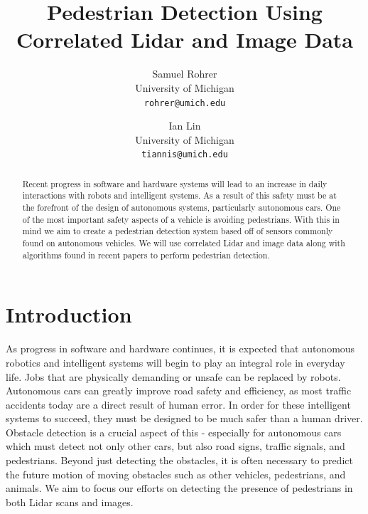 \documentclass[10pt,twocolumn,letterpaper]{article}
\begin{document}
\title{Pedestrian Detection Using Correlated Lidar and Image Data}

\author{Samuel Rohrer\\
University of Michigan\\
{\tt\small rohrer@umich.edu}
\and
Ian Lin\\
University of Michigan\\
{\tt\small tiannis@umich.edu}
}

\maketitle

\begin{abstract}
  Recent progress in software and hardware systems will lead to an increase in
  daily interactions with robots and intelligent systems. As a result of this
  safety must be at the forefront of the design of autonomous systems,
  particularly autonomous cars. One of the most important safety aspects of a
  vehicle is avoiding pedestrians. With this in mind we aim to create a pedestrian
  detection system based off of sensors commonly found on autonomous vehicles.
  We will use correlated Lidar and image data along with algorithms found in
  recent papers to perform pedestrian detection.

\end{abstract}

\section{Introduction}

  As progress in software and hardware continues, it is expected that
  autonomous robotics and intelligent systems will begin to play an integral
  role in everyday life. Jobs that are physically demanding or unsafe can be
  replaced by robots. Autonomous cars can greatly improve road safety and
  efficiency, as most traffic accidents today are a direct result of human error.
  In order for these intelligent systems to succeed, they must be designed
  to be much safer than a human driver. Obstacle detection is a crucial aspect
  of this - especially for autonomous cars which
  must detect not only other cars, but also road signs, traffic signals, and
  pedestrians. Beyond just detecting the obstacles, it is often necessary
  to predict the future motion of moving obstacles such as other vehicles,
  pedestrians, and animals. We aim to focus our efforts on detecting the presence
  of pedestrians in both Lidar scans and images.
\end{document}
